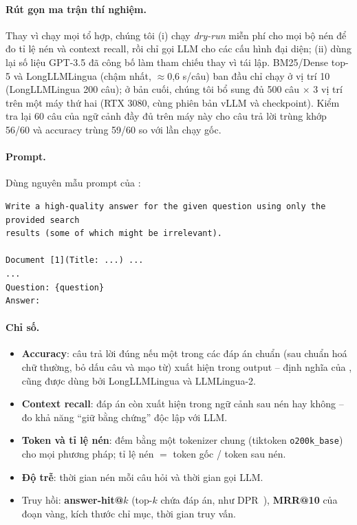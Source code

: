 \paragraph{Rút gọn ma trận thí nghiệm.} Thay vì chạy mọi tổ hợp, chúng tôi (i) chạy \emph{dry-run}
miễn phí cho mọi bộ nén để đo tỉ lệ nén và context recall, rồi chỉ gọi LLM cho các cấu hình đại diện;
(ii) dùng lại số liệu GPT-3.5 đã công bố làm tham chiếu thay vì tái lập. BM25/Dense top-5 và
LongLLMLingua (chậm nhất, $\approx$0,6 s/câu) ban đầu chỉ chạy ở vị trí 10 (LongLLMLingua 200 câu); ở
bản cuối, chúng tôi bổ sung đủ 500 câu $\times$ 3 vị trí trên một máy thứ hai (RTX 3080, cùng phiên bản
vLLM và checkpoint). Kiểm tra lại 60 câu của ngữ cảnh đầy đủ trên máy này cho câu trả lời trùng khớp
56/60 và accuracy trùng 59/60 so với lần chạy gốc.

\paragraph{Prompt.} Dùng nguyên mẫu prompt của \citet{liu2024lost}:
\begin{lstlisting}
Write a high-quality answer for the given question using only the provided search
results (some of which might be irrelevant).

Document [1](Title: ...) ...
...
Question: {question}
Answer:
\end{lstlisting}

\paragraph{Chỉ số.}
\begin{itemize}
  \item \textbf{Accuracy}: câu trả lời đúng nếu một trong các đáp án chuẩn (sau chuẩn hoá chữ thường,
  bỏ dấu câu và mạo từ) xuất hiện trong output -- định nghĩa của \citet{liu2024lost}, cũng được dùng
  bởi LongLLMLingua và LLMLingua-2.
  \item \textbf{Context recall}: đáp án còn xuất hiện trong ngữ cảnh sau nén hay không -- đo khả năng
  ``giữ bằng chứng'' độc lập với LLM.
  \item \textbf{Token và tỉ lệ nén}: đếm bằng một tokenizer chung (tiktoken \texttt{o200k\_base}) cho
  mọi phương pháp; tỉ lệ nén $=$ token gốc / token sau nén.
  \item \textbf{Độ trễ}: thời gian nén mỗi câu hỏi và thời gian gọi LLM.
  \item Truy hồi: \textbf{answer-hit@$k$} (top-$k$ chứa đáp án, như DPR~\cite{karpukhin2020dpr}),
  \textbf{MRR@10} của đoạn vàng, kích thước chỉ mục, thời gian truy vấn.
\end{itemize}
